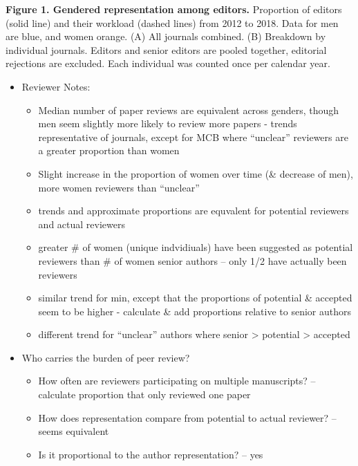\documentclass[11pt,]{article}
\providecommand{\tightlist}{%
  \setlength{\itemsep}{0pt}\setlength{\parskip}{0pt}}
\begin{document}
\textbf{Figure 1. Gendered representation among editors.} Proportion of
editors (solid line) and their workload (dashed lines) from 2012 to
2018. Data for men are blue, and women orange. (A) All journals
combined. (B) Breakdown by individual journals. Editors and senior
editors are pooled together, editorial rejections are excluded. Each
individual was counted once per calendar year.

\begin{itemize}
\tightlist
\item
  Reviewer Notes:

  \begin{itemize}
  \tightlist
  \item
    Median number of paper reviews are equivalent across genders, though
    men seem slightly more likely to review more papers - trends
    representative of journals, except for MCB where ``unclear''
    reviewers are a greater proportion than women
  \item
    Slight increase in the proportion of women over time (\& decrease of
    men), more women reviewers than ``unclear''
  \item
    trends and approximate proportions are equvalent for potential
    reviewers and actual reviewers
  \item
    greater \# of women (unique indvidiuals) have been suggested as
    potential reviewers than \# of women senior authors -- only 1/2 have
    actually been reviewers
  \item
    similar trend for min, except that the proportions of potential \&
    accepted seem to be higher - calculate \& add proportions relative
    to senior authors
  \item
    different trend for ``unclear'' authors where senior \textgreater{}
    potential \textgreater{} accepted
  \end{itemize}
\item
  Who carries the burden of peer review?

  \begin{itemize}
  \tightlist
  \item
    How often are reviewers participating on multiple manuscripts? --
    calculate proportion that only reviewed one paper
  \item
    How does representation compare from potential to actual reviewer?
    -- seems equivalent
  \item
    Is it proportional to the author representation? -- yes
  \end{itemize}
\end{itemize}
\end{document}
